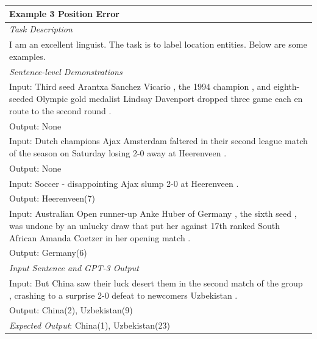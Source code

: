 \documentclass{article}
\begin{document}
\begin{table}[th!]
{\begin{tabular}{l}
\textbf{Example 3 {\color{red} Position Error}} \\\midrule
       	\textit{Task Description} \\
I am an excellent linguist. The task is to label location entities. Below are some examples. \\\midrule
\textit{Sentence-level Demonstrations} \\
Input: Third seed Arantxa Sanchez Vicario , the 1994 champion , and eighth-seeded Olympic gold medalist Lindsay Davenport dropped three game each en route to the second round . \\
Output: None \\
Input: Dutch champions Ajax Amsterdam faltered in their second league match of the season on Saturday losing 2-0 away at Heerenveen . \\
Output: None \\
Input: Soccer - disappointing Ajax slump 2-0 at Heerenveen . \\
Output: Heerenveen(7) \\
Input: Australian Open runner-up Anke Huber of Germany , the sixth seed , was undone by an unlucky draw that put her against 17th ranked South African Amanda Coetzer in her opening match . \\
Output: Germany(6) \\\midrule
\textit{Input Sentence and GPT-3 Output} \\
Input: But China saw their luck desert them in the second match of the group , crashing to a surprise 2-0 defeat to newcomers Uzbekistan . \\
Output: China(2), Uzbekistan(9) \\
{\color{blue}\it Expected Output}: China(1), Uzbekistan(23) \\\bottomrule


\end{tabular}}
\end{table}
\end{document}
